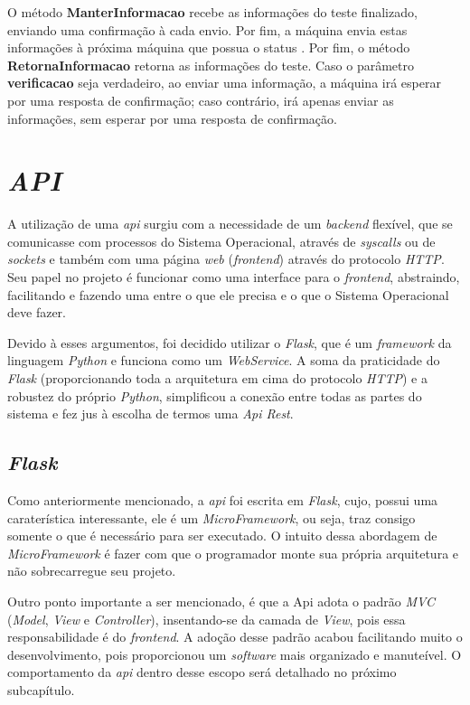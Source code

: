 O método \textbf{ManterInformacao} recebe as informações do teste finalizado, enviando uma confirmação à cada envio. Por fim, a máquina envia estas informações à próxima máquina que possua o status 
. Por fim, o método \textbf{RetornaInformacao} retorna as informações do teste. Caso o parâmetro \textbf{verificacao} seja verdadeiro, ao enviar uma informação, a máquina irá esperar por uma resposta 
de confirmação; caso contrário, irá apenas enviar as informações, sem esperar por uma resposta de confirmação.




\section{\textit{API}}
\label{sec:api}

A utilização de uma \textit{api} surgiu com a necessidade de um \textit{backend} flexível, que se comunicasse com processos do Sistema Operacional, através de \textit{syscalls} ou de \textit{sockets} e também com uma página \textit{web} (\textit{frontend}) através do protocolo \textit{HTTP}. Seu papel no projeto é funcionar como uma interface para o \textit{frontend}, abstraindo, facilitando e fazendo uma  entre o que ele precisa e o que o Sistema Operacional deve fazer.

Devido à esses argumentos, foi decidido utilizar o \textit{Flask}, que é um \textit{framework} da linguagem \textit{Python} e funciona como um \textit{WebService}. 
A soma da praticidade do \textit{Flask} (proporcionando toda a arquitetura em cima do protocolo \textit{HTTP}) e a robustez do próprio \textit{Python}, simplificou a conexão entre todas as partes do sistema e fez jus à escolha de termos uma \textit{Api Rest}.

\subsection{\textit{Flask}}
\label{sec:flask}

Como anteriormente mencionado, a \textit{api} foi escrita em \textit{Flask}, cujo, possui uma caraterística interessante, ele é um \textit{MicroFramework}, ou seja, traz consigo somente o que é necessário para ser executado. O intuito dessa abordagem de \textit{MicroFramework} é fazer com que o programador monte sua própria arquitetura e não sobrecarregue seu projeto. 

Outro ponto importante a ser mencionado, é que a Api adota o padrão \textit{MVC} (\textit{Model}, \textit{View} e \textit{Controller}), insentando-se da camada de \textit{View}, pois essa responsabilidade é do \textit{frontend}. A adoção desse padrão acabou facilitando muito o desenvolvimento, pois proporcionou um \textit{software} mais organizado e manuteível. O comportamento da \textit{api} dentro desse escopo será detalhado no próximo subcapítulo.


